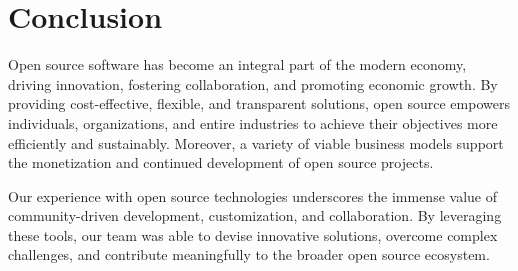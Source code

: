 \section{Conclusion}

Open source software has become an integral part of the modern economy, driving innovation, fostering collaboration, 
and promoting economic growth. By providing cost-effective, flexible, and transparent solutions, open source empowers individuals, 
organizations, and entire industries to achieve their objectives more efficiently and sustainably. Moreover, 
a variety of viable business models support the monetization and continued development of open source projects.

Our experience with open source technologies underscores the immense value of community-driven development, customization, 
and collaboration. By leveraging these tools, our team was able to devise innovative solutions, overcome complex challenges, 
and contribute meaningfully to the broader open source ecosystem.


\author{Luna Schätzle}